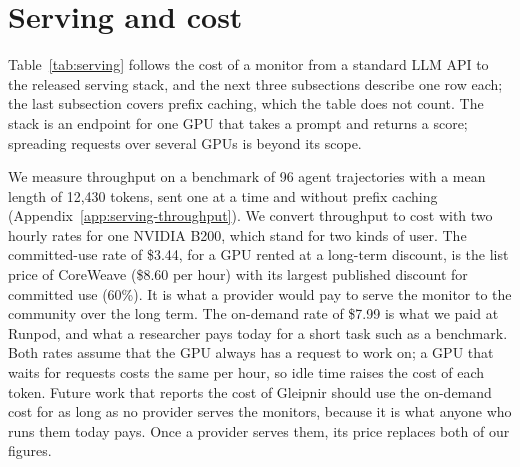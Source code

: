 \section{Serving and cost}
\label{sec:serving}

Table~\ref{tab:serving} follows the cost of a monitor from a standard LLM API to the released serving stack, and the next three subsections describe one row each; the last subsection covers prefix caching, which the table does not count.
The stack is an endpoint for one GPU that takes a prompt and returns a score; spreading requests over several GPUs is beyond its scope.

We measure throughput on a benchmark of 96 agent trajectories with a mean length of 12,430 tokens, sent one at a time and without prefix caching (Appendix~\ref{app:serving-throughput}).
We convert throughput to cost with two hourly rates for one NVIDIA B200, which stand for two kinds of user.
The committed-use rate of \$3.44, for a GPU rented at a long-term discount, is the list price of CoreWeave (\$8.60 per hour) with its largest published discount for committed use (60\%).
It is what a provider would pay to serve the monitor to the community over the long term.
The on-demand rate of \$7.99 is what we paid at Runpod, and what a researcher pays today for a short task such as a benchmark.
Both rates assume that the GPU always has a request to work on; a GPU that waits for requests costs the same per hour, so idle time raises the cost of each token.
Future work that reports the cost of Gleipnir should use the on-demand cost for as long as no provider serves the monitors, because it is what anyone who runs them today pays.
Once a provider serves them, its price replaces both of our figures.

